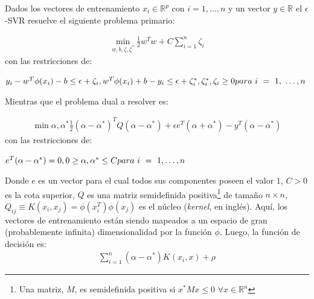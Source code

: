       Dados los vectores de entrenamiento $x_{i} \in \mathbb{R}^{p}$ con $i = 1, \dots ,n$
      y un vector $y \in \mathbb{R}$ el $\epsilon$-SVR resuelve el siguiente problema
      primario:

      \begin{align}
        \min\limits_{w, b, \zeta, \zeta^{*}} \frac{1}{2} w^{T} w + C \sum_{i = 1}^{n} \zeta_{i}
      \end{align}
      con las restricciones de:


      \begin{math}
        y_{i} - w^{T} \phi(x_{i}) - b \leq \epsilon + \zeta_{i}, \\
        w^{T} \phi(x_{i}) + b - y_{i} \leq \epsilon + \zeta^{*}_{i}, \\
              \zeta^{*}_{i}, \zeta_{i} \geq 0 \\
        para\ i\ =\ 1,\ \dots, n
      \end{math}

      Mientras que el problema dual a resolver es:

      \begin{align}
        \min\limits{\alpha, \alpha^{*}} \frac{1}{2} (\alpha - \alpha^{*})^{T}
        Q(\alpha - \alpha^{*}) + \epsilon e^{T} (\alpha + \alpha^{*}) -
        y^{T} (\alpha - \alpha^{*})
      \end{align}
      con las restricciones de:

      \begin{math}
        e^{T} (\alpha - \alpha^{*}) = 0, \\
        0 \geq \alpha, \alpha^{*} \leq C \\
        para\ i\ =\ 1, \dots, n
      \end{math}

    \par Donde $e$ es un vector para el cual todos sus componentes poseen el valor $1$, $C > 0$
      es la cota superior, $Q$ es una matriz semidefinida
      positiva\footnote{Una matriz, $M$, es semidefinida positiva si $x^{*}Mx \leq 0$
      $\forall x \in \mathbb{R}^{n}$} de tamaño $n \times n$,
      $Q_{ij} \equiv K(x_{i}, x_{j}) = \phi(x_{i}^{T})\phi(x_{j})$ es el núcleo
      (\textit{kernel}, en inglés). Aquí, los vectores de entrenamiento están siendo mapeados
      a un espacio de gran (probablemente infinita) dimensionalidad por la función
      $\phi$.
      Luego, la función de decisión es:
      \begin{align}
        \sum_{i = 1}^{n} (\alpha - \alpha^{*})K(x_{i}, x) + \rho
      \end{align}


